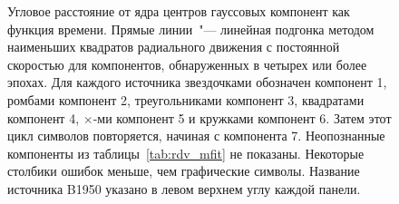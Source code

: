 \begin{figure}[tbh]
 \caption{Угловое расстояние от ядра центров гауссовых компонент как функция времени.
Прямые линии~"--- линейная подгонка методом наименьших квадратов радиального движения с постоянной
скоростью для компонентов, обнаруженных в четырех или более эпохах. Для каждого источника
звездочками обозначен компонент 1, ромбами компонент 2, треугольниками компонент 3, квадратами
компонент 4, $\times$-ми компонент 5 и кружками компонент 6. Затем этот цикл символов
повторяется, начиная с компонента 7. Неопознанные компоненты из таблицы~\ref{tab:rdv_mfit} не
показаны. Некоторые столбики ошибок меньше, чем графические символы. Название источника B1950
указано в левом верхнем углу каждой панели.}
 \label{fig:rdv_sep}
\end{figure}

